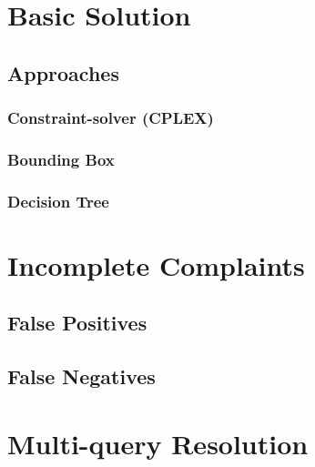 \section{Basic Solution}

\subsection{Approaches}

\subsubsection{Constraint-solver (CPLEX)}
\subsubsection{Bounding Box}
\subsubsection{Decision Tree}

\section{Incomplete Complaints}

\subsection{False Positives}

\subsection{False Negatives}

\section{Multi-query Resolution}


